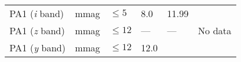 \documentclass[DM,toc]{lsstdoc}
\begin{document}
\begin{longtable}[]{@{}llllll@{}}
\begin{minipage}[t]{0.14\columnwidth}
PA1 (\emph{i} band)\strut
\end{minipage} & \begin{minipage}[t]{0.06\columnwidth}\raggedright\strut
mmag\strut
\end{minipage} & \begin{minipage}[t]{0.17\columnwidth}\raggedright\strut
\(\leq 5\)\strut
\end{minipage} & \begin{minipage}[t]{0.17\columnwidth}\raggedright\strut
8.0\strut
\end{minipage} & \begin{minipage}[t]{0.12\columnwidth}\raggedright\strut
11.99\strut
\end{minipage} & \begin{minipage}[t]{0.17\columnwidth}\raggedright\strut
\strut
\end{minipage}\tabularnewline
\begin{minipage}[t]{0.14\columnwidth}\raggedright\strut
PA1 (\emph{z} band)\strut
\end{minipage} & \begin{minipage}[t]{0.06\columnwidth}\raggedright\strut
mmag\strut
\end{minipage} & \begin{minipage}[t]{0.17\columnwidth}\raggedright\strut
\(\leq 12\)\strut
\end{minipage} & \begin{minipage}[t]{0.17\columnwidth}\raggedright\strut
---\strut
\end{minipage} & \begin{minipage}[t]{0.12\columnwidth}\raggedright\strut
---\strut
\end{minipage} & \begin{minipage}[t]{0.17\columnwidth}\raggedright\strut
No data\strut
\end{minipage}\tabularnewline
\begin{minipage}[t]{0.14\columnwidth}\raggedright\strut
PA1 (\emph{y} band)\strut
\end{minipage} & \begin{minipage}[t]{0.06\columnwidth}\raggedright\strut
mmag\strut
\end{minipage} & \begin{minipage}[t]{0.17\columnwidth}\raggedright\strut
\(\leq 12\)\strut
\end{minipage} & \begin{minipage}[t]{0.17\columnwidth}\raggedright\strut
12.0\strut
\end{minipage} & \begin{minipage}[t]{0.12\columnwidth}\raggedright\strut

\end{minipage}
\end{longtable}
\end{document}
